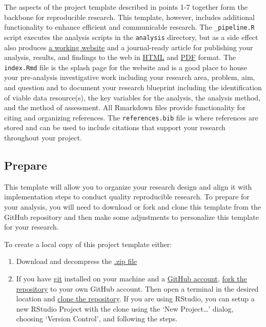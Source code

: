 \documentclass[
  letterpaper,
]{latex/krantz}
\providecommand{\tightlist}{%
  \setlength{\itemsep}{0pt}\setlength{\parskip}{0pt}}\usepackage{longtable,booktabs,array}
\begin{document}
The aspects of the project template described in points 1-7 together
form the backbone for reproducible research. This template, however,
includes additional functionality to enhance efficient and communicable
research. The \texttt{\_pipeline.R} script executes the analysis scripts
in the \texttt{analysis} directory, but as a side effect also produces
\href{https://lin380.github.io/project_template_demo/}{a working
website} and a journal-ready article for publishing your analysis,
results, and findings to the web in
\href{https://lin380.github.io/project_template_demo/5_generate_article.html}{HTML}
and
\href{https://lin380.github.io/project_template_demo/article.pdf}{PDF}
format. The \texttt{index.Rmd} file is the splash page for the website
and is a good place to house your pre-analysis investigative work
including your research area, problem, aim, and question and to document
your research blueprint including the identification of viable data
resource(s), the key variables for the analysis, the analysis method,
and the method of assessment. All Rmarkdown files provide functionality
for citing and organizing references. The \texttt{references.bib} file
is where references are stored and can be used to include citations that
support your research throughout your project.

\hypertarget{prepare}{%
\subsection{Prepare}\label{prepare}}

This template will allow you to organize your research design and align
it with implementation steps to conduct quality reproducible research.
To prepare for your analysis, you will need to download or fork and
clone this template from the GitHub repository and then make some
adjustments to personalize this template for your research.

To create a local copy of this project template either:

\begin{enumerate}
\def\labelenumi{\arabic{enumi}.}
\tightlist
\item
  Download and decompress the
  \href{https://github.com/lin380/project_template/archive/refs/heads/main.zip}{.zip
  file}
\item
  If you have \href{https://github.com/git-guides/install-git}{git}
  installed on your machine and a
  \href{https://github.com/signup?ref_cta=Sign+up\&ref_loc=header+logged+out\&ref_page=\%2F\&source=header-home}{GitHub
  account},
  \href{https://docs.github.com/en/get-started/quickstart/fork-a-repo\#forking-a-repository}{fork
  the repository} to your own GitHub account. Then open a terminal in
  the desired location and
  \href{https://docs.github.com/en/github/creating-cloning-and-archiving-repositories/cloning-a-repository-from-github/cloning-a-repository\#cloning-a-repository}{clone
  the repository}. If you are using RStudio, you can setup a new RStudio
  Project with the clone using the `New Project\ldots{}' dialog,
  choosing `Version Control', and following the steps.
\end{enumerate}
\end{document}
